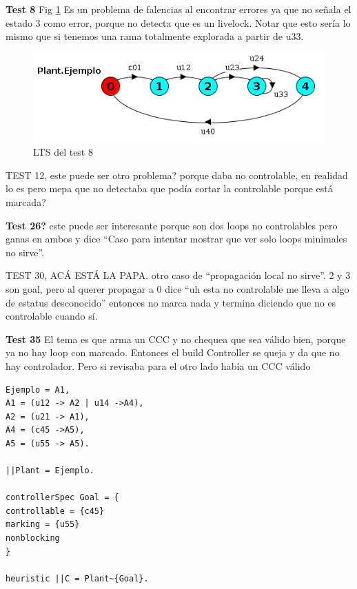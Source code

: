 \smallskip
\textbf{Test 8} Fig \ref{fig:test8} Es un problema de falencias al encontrar errores ya que no señala el estado 3 como error, porque no detecta que es un livelock. Notar que esto sería lo mismo que si tenemos una rama totalmente explorada a partir de u33.
\begin{figure}
 \centering
 \includegraphics[scale=0.7]{figures/tests/test8.png}
 \caption{LTS del test 8}
 \label{fig:test8}
\end{figure}

TEST 12, este puede ser otro problema? porque daba no controlable, en realidad lo es pero mepa que no detectaba que podía cortar la controlable porque está marcada?

\smallskip
\textbf{Test 26?} este puede ser interesante porque son dos loops no controlables pero ganas en ambos y dice ``Caso para intentar mostrar que ver solo loops minimales no sirve''. %

TEST 30, ACÁ ESTÁ LA PAPA. otro caso de ``propagación local no sirve''. 2 y 3 son goal, pero al querer propagar a 0 dice ``uh esta no controlable me lleva a algo de estatus desconocido'' entonces no marca nada y termina diciendo que no es controlable cuando sí. %

\smallskip
\textbf{Test 35} El tema es que arma un CCC y no chequea que sea válido bien, porque ya no hay loop con marcado. Entonces el build Controller se queja y da que no hay controlador. Pero si revisaba para el otro lado había un CCC válido




\begin{lstlisting}[language = mtsa, caption=Test 1 a modo de ejemplo] 
Ejemplo = A1,
A1 = (u12 -> A2 | u14 ->A4),
A2 = (u21 -> A1),
A4 = (c45 ->A5),
A5 = (u55 -> A5).

||Plant = Ejemplo.

controllerSpec Goal = {
controllable = {c45}
marking = {u55}
nonblocking
}

heuristic ||C = Plant~{Goal}.
\end{lstlisting}
